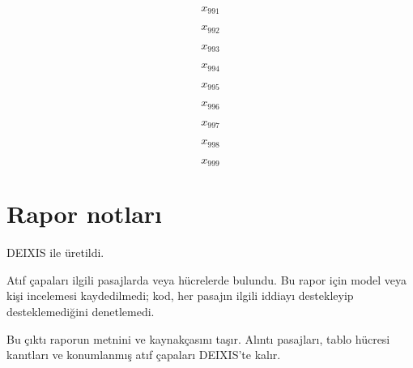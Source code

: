 \documentclass[journal]{IEEEtran}
\begin{document}
\begin{equation}
\label{eq:EQ991}
x_{991}
\end{equation}
\cite{Synth26}

\begin{equation}
\label{eq:EQ992}
x_{992}
\end{equation}
\cite{Synth26}

\begin{equation}
\label{eq:EQ993}
x_{993}
\end{equation}
\cite{Synth26}

\begin{equation}
\label{eq:EQ994}
x_{994}
\end{equation}
\cite{Synth26}

\begin{equation}
\label{eq:EQ995}
x_{995}
\end{equation}
\cite{Synth26}

\begin{equation}
\label{eq:EQ996}
x_{996}
\end{equation}
\cite{Synth26}

\begin{equation}
\label{eq:EQ997}
x_{997}
\end{equation}
\cite{Synth26}

\begin{equation}
\label{eq:EQ998}
x_{998}
\end{equation}
\cite{Synth26}

\begin{equation}
\label{eq:EQ999}
x_{999}
\end{equation}
\cite{Synth26}

\section*{Rapor notları}

DEIXIS ile üretildi.

Atıf çapaları ilgili pasajlarda veya hücrelerde bulundu. Bu rapor için model veya kişi incelemesi kaydedilmedi; kod, her pasajın ilgili iddiayı destekleyip desteklemediğini denetlemedi.

Bu çıktı raporun metnini ve kaynakçasını taşır. Alıntı pasajları, tablo hücresi kanıtları ve konumlanmış atıf çapaları DEIXIS'te kalır.




\end{document}
